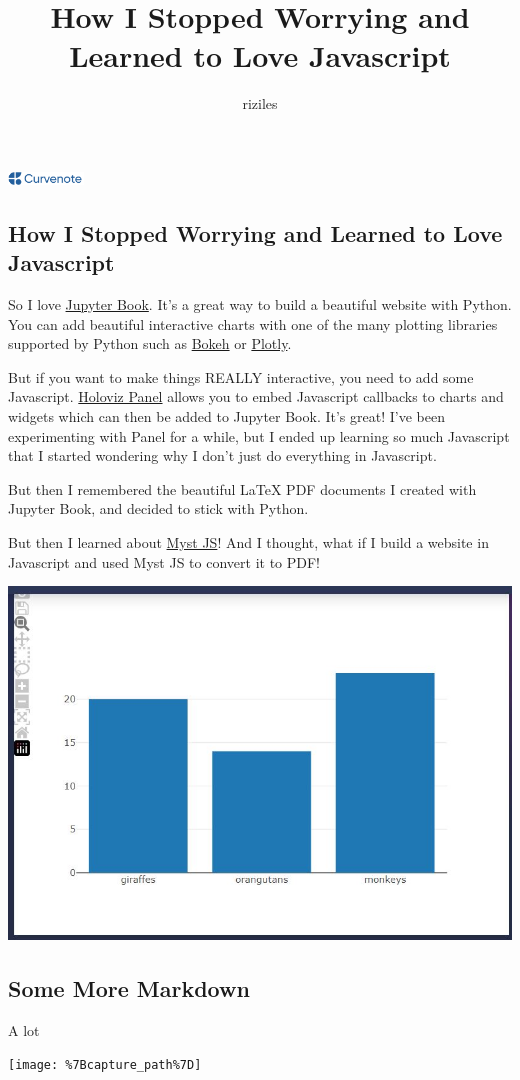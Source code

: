 \documentclass{article}
\title{How I Stopped Worrying and Learned to Love Javascript}
\author{riziles}
\date{\displaydate{articleDate}}
\newcommand{\logo}{
  \href{https://curvenote.com}{\includegraphics[width=2cm]{curvenote.png}}
}
\begin{document}
\maketitle
\begin{center}\logo\end{center}


\subsection*{How I Stopped Worrying and Learned to Love Javascript}

So I love \href{https://jupyterbook.org/en/stable/start/your-first-book.html}{Jupyter Book}.
It's a great way to build a beautiful website with Python.
You can add beautiful interactive charts with one of the many plotting libraries supported by Python
such as \href{https://bokeh.org/}{Bokeh} or \href{https://plotly.com/python/}{Plotly}.

But if you want to make things REALLY interactive, you need to add some Javascript.
\href{https://panel.holoviz.org/user_guide/Links.html#defining-javascript-callbacks}{Holoviz Panel}
allows you to embed Javascript callbacks to charts and widgets which
can then be added to Jupyter Book. It's great! I've been experimenting with Panel for a while,
but I ended up learning so much Javascript that I started wondering why I don't just do everything in Javascript.

But then I remembered the beautiful LaTeX PDF documents I created with Jupyter Book,
and decided to stick with Python.

But then I learned about \href{https://myst-tools.org/docs/mystjs}{Myst JS}! And I thought,
what if I build a website in Javascript and used Myst JS to convert it to PDF!

\includegraphics[width=0.7\linewidth]{images/Capture-66229861614f82eda7af02004c12ddc1.JPG}

\subsection*{Some More Markdown}

A lot

\texttt{[image: \%7Bcapture\_path\%7D]}



\end{document}
